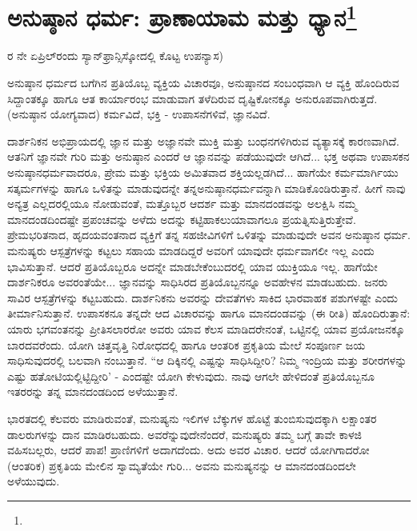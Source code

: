 
\chapter[ಅನುಷ್ಠಾನ ಧರ್ಮ: ಪ್ರಾಣಾಯಾಮ ಮತ್ತು ಧ್ಯಾನ]{ಅನುಷ್ಠಾನ ಧರ್ಮ: ಪ್ರಾಣಾಯಾಮ ಮತ್ತು ಧ್ಯಾನ\protect\footnote{}}

\begin{center}
ರ ನೇ ಏಪ್ರಿಲ್‌ರಂದು ಸ್ಯಾನ್‌ಫ್ರಾನ್ಸಿಸ್ಕೋದಲ್ಲಿ ಕೊಟ್ಟ ಉಪನ್ಯಾಸ)
\end{center}

ಅನುಷ್ಠಾನ ಧರ್ಮದ ಬಗೆಗಿನ ಪ್ರತಿಯೊಬ್ಬ ವ್ಯಕ್ತಿಯ ವಿಚಾರವೂ, ಅನುಷ್ಠಾನದ ಸಂಬಂಧವಾಗಿ ಆ ವ್ಯಕ್ತಿ ಹೊಂದಿರುವ ಸಿದ್ದಾಂತಕ್ಕೂ ಹಾಗೂ ಆತ ಕಾರ್ಯಾರಂಭ ಮಾಡುವಾಗ ತಳೆದಿರುವ ದೃಷ್ಟಿಕೋನಕ್ಕೂ ಅನುರೂಪವಾಗಿರುತ್ತದೆ. (ಅನುಷ್ಠಾನ ಯೋಗ್ಯವಾದ) ಕರ್ಮವಿದೆ, ಭಕ್ತಿ - ಉಪಾಸನೆಗಳಿವೆ, ಜ್ಞಾನವಿದೆ.

ದಾರ್ಶನಿಕನ ಅಭಿಪ್ರಾಯದಲ್ಲಿ ಜ್ಞಾನ ಮತ್ತು ಅಜ್ಞಾನವೇ ಮುಕ್ತಿ ಮತ್ತು ಬಂಧನಗಳಿಗಿರುವ ವ್ಯತ್ಯಾಸಕ್ಕೆ ಕಾರಣವಾಗಿದೆ. ಆತನಿಗೆ ಜ್ಞಾನವೇ ಗುರಿ ಮತ್ತು ಅನುಷ್ಠಾನ ಎಂದರೆ ಆ ಜ್ಞಾನವನ್ನು ಪಡೆಯುವುದೇ ಆಗಿದೆ... ಭಕ್ತ ಅಥವಾ ಉಪಾಸಕನ ಅನುಷ್ಠಾನಧರ್ಮವಾದರೂ, ಪ್ರೇಮ ಮತ್ತು ಭಕ್ತಿಯ ಅಮಿತವಾದ ಶಕ್ತಿಯಲ್ಲಡಗಿದೆ... ಹಾಗೆಯೇ ಕರ್ಮಮಾರ್ಗಿಯು ಸತ್ಕರ್ಮಗಳನ್ನು ಹಾಗೂ ಒಳಿತನ್ನು ಮಾಡುವುದನ್ನೇ ತನ್ನ\break ಅನುಷ್ಠಾನಧರ್ಮವನ್ನಾಗಿ ಮಾಡಿಕೊಂಡಿರುತ್ತಾನೆ. ಹೀಗೆ ನಾವು ಅನ್ಯತ್ರ ಎಲ್ಲದರಲ್ಲಿಯೂ ನೋಡುವಂತೆ, ಮತ್ತೊಬ್ಬರ ಆದರ್ಶ ಮತ್ತು ಮಾನದಂಡವನ್ನು ಅಲಕ್ಷಿಸಿ ನಮ್ಮ ಮಾನದಂಡದಿಂದಷ್ಟೇ ಪ್ರಪಂಚವನ್ನು ಅಳೆದು ಅದನ್ನು ಕಟ್ಟಿಹಾಕಲು\break ಯಾವಾಗಲೂ ಪ್ರಯತ್ನಿಸುತ್ತಿರುತ್ತೇವೆ. ಪ್ರೇಮಭರಿತನಾದ, ಹೃದಯವಂತನಾದ ವ್ಯಕ್ತಿಗೆ ತನ್ನ ಸಹಜೀವಿಗಳಿಗೆ ಒಳಿತನ್ನು ಮಾಡುವುದೇ ಅವನ ಅನುಷ್ಠಾನ ಧರ್ಮ. ಮನುಷ್ಯರು ಆಸ್ಪತ್ರೆಗಳನ್ನು ಕಟ್ಟಲು ಸಹಾಯ ಮಾಡದಿದ್ದರೆ ಅವರಿಗೆ ಯಾವುದೇ ಧರ್ಮವಾಗಲೀ ಇಲ್ಲ ಎಂದು ಭಾವಿಸುತ್ತಾನೆ. ಆದರೆ ಪ್ರತಿಯೊಬ್ಬರೂ ಅದನ್ನೇ ಮಾಡಬೇಕೆಂಬುದರಲ್ಲಿ ಯಾವ ಯುಕ್ತಿಯೂ ಇಲ್ಲ. ಹಾಗೆಯೇ ದಾರ್ಶನಿಕರೂ ಅವರಂತೆಯೇ... ಜ್ಞಾನವನ್ನು ಸಾಧಿಸಿರದ ಪ್ರತಿಯೊಬ್ಬನನ್ನೂ ಅವಹೇಳನ ಮಾಡಬಹುದು. ಜನರು  ಸಾವಿರ ಆಸ್ಪತ್ರೆಗಳನ್ನು ಕಟ್ಟಬಹುದು. ದಾರ್ಶನಿಕನು ಅವರನ್ನು ದೇವತೆಗಳು ಸಾಕಿದ ಭಾರವಾಹಕ ಪಶುಗಳಷ್ಟೇ ಎಂದು ತೀರ್ಮಾನಿಸುತ್ತಾನೆ. ಉಪಾಸಕನೂ ತನ್ನದೇ ಆದ ವಿಚಾರವನ್ನು ಹಾಗೂ ಮಾನದಂಡವನ್ನು (ಈ ರೀತಿ) ಹೊಂದಿರುತ್ತಾನೆ: ಯಾರು ಭಗವಂತನನ್ನು ಪ್ರೀತಿಸಲಾರರೋ ಅವರು ಯಾವ ಕೆಲಸ ಮಾಡಿದರೇನಂತೆ, ಒಟ್ಟಿನಲ್ಲಿ ಯಾವ ಪ್ರಯೋಜನಕ್ಕೂ ಬಾರದವರೆಂದು. ಯೋಗಿ ಚಿತ್ತವೃತ್ತಿ ನಿರೋಧದಲ್ಲಿ ಹಾಗೂ ಆಂತರಿಕ ಪ್ರಕೃತಿಯ ಮೇಲೆ ಸಂಪೂರ್ಣ ಜಯ ಸಾಧಿಸುವುದರಲ್ಲಿ ಬಲವಾಗಿ ನಂಬುತ್ತಾನೆ. “ಆ ದಿಕ್ಕಿನಲ್ಲಿ ಎಷ್ಟನ್ನು ಸಾಧಿಸಿದ್ದೀರಿ? ನಿಮ್ಮ ಇಂದ್ರಿಯ ಮತ್ತು ಶರೀರಗಳನ್ನು ಎಷ್ಟು ಹತೋಟಿಯಲ್ಲಿಟ್ಟಿದ್ದೀರಿ' - ಎಂದಷ್ಟೇ ಯೋಗಿ ಕೇಳುವುದು. ನಾವು ಆಗಲೇ ಹೇಳಿದಂತೆ ಪ್ರತಿಯೊಬ್ಬನೂ ಇತರರನ್ನು ತನ್ನ ಮಾನದಂಡದಿಂದ ಅಳೆಯುತ್ತಾನೆ.

\break

ಭಾರತದಲ್ಲಿ ಕೆಲವರು ಮಾಡಿರುವಂತೆ, ಮನುಷ್ಯನು ಇಲಿಗಳ ಬೆಕ್ಕುಗಳ ಹೊಟ್ಟೆ ತುಂಬಿಸುವುದಕ್ಕಾಗಿ ಲಕ್ಷಾಂತರ ಡಾಲರುಗಳನ್ನು ದಾನ ಮಾಡಿರಬಹುದು. ಅವರೆನ್ನುವುದೇನೆಂದರೆ, ಮನುಷ್ಯರು ತಮ್ಮ ಬಗ್ಗೆ ತಾವೇ ಕಾಳಜಿ ವಹಿಸಬಲ್ಲರು, ಆದರೆ ಪಾಪ! ಪ್ರಾಣಿಗಳಿಗೆ ಅದಾಗದೆಂದು. ಅದು ಅವರ ವಿಚಾರ. ಆದರೆ ಯೋಗಿಗಾದರೋ (ಆಂತರಿಕ) ಪ್ರಕೃತಿಯ ಮೇಲಿನ ಸ್ವಾಮ್ಯತೆಯೇ ಗುರಿ... ಅವನು ಮನುಷ್ಯನನ್ನು ಆ ಮಾನದಂಡದಿಂದಲೇ ಅಳೆಯುವುದು.

